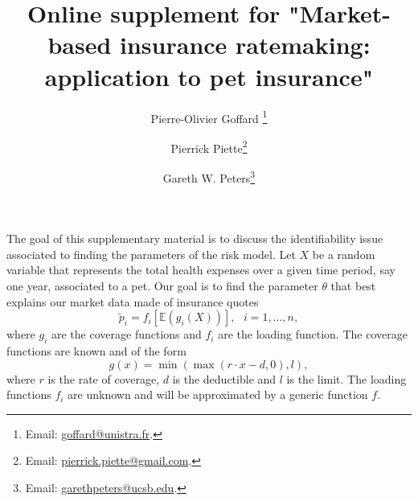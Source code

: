 \documentclass[10pt]{article}
\renewcommand{\tilde}{\widetilde}
\begin{document}
\title{Online supplement for "Market-based insurance ratemaking: application to pet insurance"}
\author[1]{Pierre-Olivier Goffard \footnote{Email: \href{mailto:goffard@unistra.fr}{goffard@unistra.fr}.}}
\author[2,3]{Pierrick Piette\footnote{Email: \href{mailto:pierrick.piette@gmail.com}{pierrick.piette@gmail.com}.}}
\author[4]{Gareth W. Peters\footnote{Email: \href{mailto:garethpeters@ucsb.edu}{garethpeters@ucsb.edu}.}}

\maketitle
\vspace{3mm}
The goal of this supplementary material is to discuss the identifiability issue associated to finding the parameters of the risk model. Let $X$ be a random variable that represents the total health expenses over a given time period, say one year, associated to a pet. Our goal is to find the parameter $\theta$ that best explains our market data made of insurance quotes
\begin{equation}\label{eq:commercial_premiums}
\tilde{p}_i = f_i\left[\mathbb{E}(g_i(X))\right],\text{ }i = 1,\ldots, n,
\end{equation}
where $g_i$ are the coverage functions and $f_i$ are the loading function. The coverage functions are known and of the form
$$
g(x) = \min(\max(r\cdot x - d, 0), l),
$$
where $r$ is the rate of coverage, $d$ is the deductible and $l$ is the limit. The loading functions $f_i$ are unknown and will be approximated by a generic function $f$. 
\end{document}
